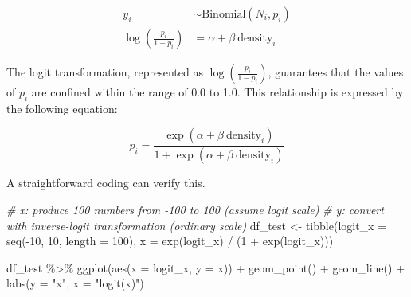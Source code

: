 \documentclass[
]{book}
\newenvironment{Shaded}{\begin{snugshade}}{\end{snugshade}}
\newcommand{\AttributeTok}[1]{\textcolor[rgb]{0.77,0.63,0.00}{#1}}
\newcommand{\CommentTok}[1]{\textcolor[rgb]{0.56,0.35,0.01}{\textit{#1}}}
\newcommand{\DecValTok}[1]{\textcolor[rgb]{0.00,0.00,0.81}{#1}}
\newcommand{\FunctionTok}[1]{\textcolor[rgb]{0.00,0.00,0.00}{#1}}
\newcommand{\NormalTok}[1]{#1}
\newcommand{\OtherTok}[1]{\textcolor[rgb]{0.56,0.35,0.01}{#1}}
\newcommand{\SpecialCharTok}[1]{\textcolor[rgb]{0.00,0.00,0.00}{#1}}
\newcommand{\StringTok}[1]{\textcolor[rgb]{0.31,0.60,0.02}{#1}}
\begin{document}
\[
\begin{aligned}
y_i &\sim \text{Binomial}(N_i, p_i)\\
\log(\frac{p_i}{1-p_i}) &= \alpha + \beta~\text{density}_i 
\end{aligned}
\]

The logit transformation, represented as \(\log\left(\frac{p_i}{1-p_i}\right)\), guarantees that the values of \(p_i\) are confined within the range of 0.0 to 1.0. This relationship is expressed by the following equation:

\[
p_i = \frac{\exp(\alpha + \beta~\text{density}_i)}{1 + \exp(\alpha + \beta~\text{density}_i)}
\]

A straightforward coding can verify this.

\begin{Shaded}
\begin{Highlighting}[]
\CommentTok{\# x: produce 100 numbers from {-}100 to 100 (assume logit scale)}
\CommentTok{\# y: convert with inverse{-}logit transformation (ordinary scale)}
\NormalTok{df\_test }\OtherTok{\textless{}{-}} \FunctionTok{tibble}\NormalTok{(}\AttributeTok{logit\_x =} \FunctionTok{seq}\NormalTok{(}\SpecialCharTok{{-}}\DecValTok{10}\NormalTok{, }\DecValTok{10}\NormalTok{, }\AttributeTok{length =} \DecValTok{100}\NormalTok{),}
                  \AttributeTok{x =} \FunctionTok{exp}\NormalTok{(logit\_x) }\SpecialCharTok{/}\NormalTok{ (}\DecValTok{1} \SpecialCharTok{+} \FunctionTok{exp}\NormalTok{(logit\_x)))}

\NormalTok{df\_test }\SpecialCharTok{\%\textgreater{}\%} 
  \FunctionTok{ggplot}\NormalTok{(}\FunctionTok{aes}\NormalTok{(}\AttributeTok{x =}\NormalTok{ logit\_x,}
             \AttributeTok{y =}\NormalTok{ x)) }\SpecialCharTok{+}
  \FunctionTok{geom\_point}\NormalTok{() }\SpecialCharTok{+}
  \FunctionTok{geom\_line}\NormalTok{() }\SpecialCharTok{+}
  \FunctionTok{labs}\NormalTok{(}\AttributeTok{y =} \StringTok{"x"}\NormalTok{,}
       \AttributeTok{x =} \StringTok{"logit(x)"}\NormalTok{)}
\end{Highlighting}
\end{Shaded}
\end{document}

